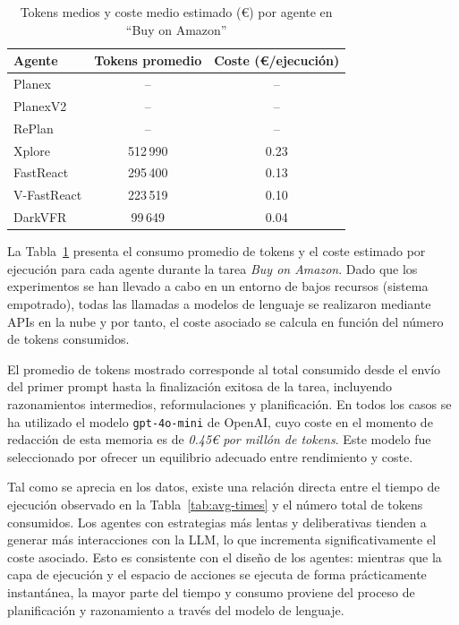 \begin{table}[!h]
\centering
\caption{Tokens medios y coste medio estimado (€) por agente en “Buy on Amazon”}
\label{tab:tokens-cost-navigate-web}
\begin{tabular}{p{3cm} c c}
\toprule
\textbf{Agente}    & \textbf{Tokens promedio} & \textbf{Coste (€/ejecución)} \\
\midrule
Planex             & --       & --     \\
PlanexV2           & --       & --     \\
RePlan             & --       & --     \\
Xplore             & 512\,990 & 0.23   \\
FastReact          & 295\,400 & 0.13   \\
V-FastReact        & 223\,519 & 0.10   \\
DarkVFR            &  99\,649 & 0.04   \\
\bottomrule
\end{tabular}
\end{table}

La Tabla~\ref{tab:tokens-cost-navigate-web} presenta el consumo promedio de
tokens y el coste estimado por ejecución para cada agente durante la tarea
\emph{Buy on Amazon}. Dado que los experimentos se han llevado a cabo en un
entorno de bajos recursos (sistema empotrado), todas las llamadas a modelos 
de lenguaje se realizaron mediante APIs en la nube y por tanto, el coste
asociado se calcula en función del número de tokens consumidos.

El promedio de tokens mostrado corresponde al total consumido desde el envío del
primer prompt hasta la finalización exitosa de la tarea, incluyendo
razonamientos intermedios, reformulaciones y planificación. En todos los casos
se ha utilizado el modelo \texttt{gpt-4o-mini} de OpenAI, cuyo coste en el momento
de redacción de esta memoria es de \emph{0.45€ por millón de tokens}. Este modelo fue
seleccionado por ofrecer un equilibrio adecuado entre rendimiento y coste.

Tal como se aprecia en los datos, existe una relación directa entre el tiempo de
ejecución observado en la Tabla~\ref{tab:avg-times} y el número total de tokens
consumidos. Los agentes con estrategias más lentas y deliberativas tienden a
generar más interacciones con la LLM, lo que incrementa significativamente el
coste asociado. Esto es consistente con el diseño de los agentes: mientras que
la capa de ejecución y el espacio de acciones se ejecuta de forma prácticamente 
instantánea, la mayor parte del tiempo y consumo proviene del proceso de planificación y razonamiento
a través del modelo de lenguaje.

